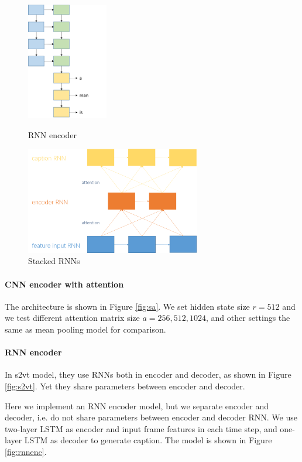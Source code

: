 \begin{figure}[htbp]
\begin{minipage}[t]{0.5\linewidth}
\centering
\includegraphics[width=1.4in]{resources/rnnenc.png}
\caption{RNN encoder}
\label{fig:rnnenc}
\end{minipage}
\begin{minipage}[t]{0.5\linewidth}
\centering
\includegraphics[width=3in]{resources/stack.png}
\caption{Stacked RNNs}
\label{fig:stack}
\end{minipage}
\end{figure}

\paragraph{CNN encoder with attention}
The architecture is shown in Figure \ref{fig:sa}. We set hidden state size $r=512$ and we test different attention matrix size $a=256,512,1024$, and other settings the same as mean pooling model for comparison.

\paragraph{RNN encoder}
In s2vt \cite{venugopalan2015sequence} model, they use RNNs both in encoder and decoder, as shown in Figure \ref{fig:s2vt}. Yet they share parameters between encoder and decoder.

Here we implement an RNN encoder model, but we separate encoder and decoder, i.e. do not share parameters between encoder and decoder RNN. We use two-layer LSTM as encoder and input frame features in each time step, and one-layer LSTM as decoder to generate caption. The model is shown in Figure \ref{fig:rnnenc}.

